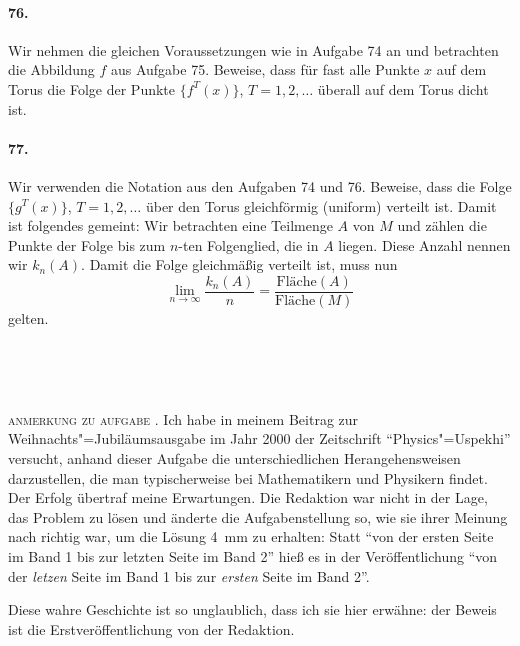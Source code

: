 \documentclass[10pt,a5paper,twoside]{article}
\newenvironment{problem}[1]{\paragraph*{#1}}{}
\begin{document}
\begin{problem}{76.}
Wir nehmen die gleichen Voraussetzungen wie in Aufgabe 74 an und betrachten die Abbildung $f$ aus Aufgabe 75. Beweise, dass für fast alle Punkte $x$ auf dem Torus die Folge der Punkte $\{f^T (x)\}$, $T=1, 2, \dots$ überall auf dem Torus dicht ist. 


\end{problem}

\begin{problem}{77.}
Wir verwenden die Notation aus den Aufgaben 74 und 76. Beweise, dass die Folge $\{g^T (x)\}$, $T=1, 2, \dots$ über den Torus gleichförmig (uniform) verteilt ist. Damit ist folgendes gemeint: 
Wir betrachten eine Teilmenge $A$ von $M$ und zählen die Punkte der Folge bis zum $n$-ten Folgenglied, die in $A$ liegen. Diese Anzahl nennen wir $k_n(A)$. 
Damit die Folge gleichmäßig verteilt ist, muss nun 
\[
\lim_{n \to \infty} \frac{k_n(A)}{n}=\frac{{\text{Fläche}} (A)}{{\text{Fläche}} (M)}
\]
gelten. 
\end{problem}
\ 

\ 

\ 

\noindent\textsc{anmerkung zu aufgabe }. Ich habe in meinem Beitrag zur Weihnachts"=Jubiläumsausgabe im Jahr 2000 der Zeitschrift \enquote{Physics"=Uspekhi} versucht, anhand dieser Aufgabe die unterschiedlichen Herangehensweisen darzustellen, die man typischerweise bei Mathematikern und Physikern findet. Der Erfolg übertraf meine Erwartungen. Die Redaktion war nicht in der Lage, das Problem zu lösen und änderte die Aufgabenstellung so, wie sie ihrer Meinung nach richtig war, um die Lösung \SI{4}{\mm} zu erhalten: Statt \enquote{von der ersten Seite im Band 1 bis zur letzten Seite im Band 2} hieß es in der Veröffentlichung \enquote{von der \emph{letzen} Seite im Band 1 bis zur \emph{ersten} Seite im Band 2}. 

Diese wahre Geschichte ist so unglaublich, dass ich sie hier erwähne: der Beweis ist die Erstveröffentlichung von der Redaktion.
\end{document}
